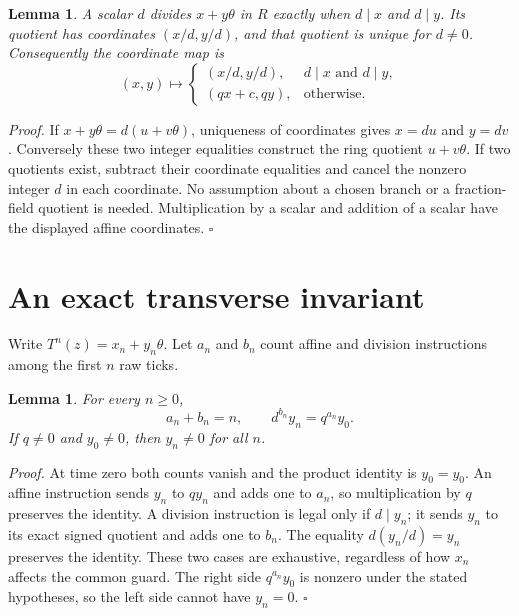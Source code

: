\documentclass[11pt,letterpaper]{article}
\newtheorem{lemma}[theorem]{Lemma}
\newenvironment{proof}{\noindent\textit{Proof.}}{\hfill\(\square\)}
\begin{document}
\begin{lemma}\label{Lem:Guard}
A scalar \(d\) divides \(x+y\theta\) in \(R\) exactly when \(d\mid x\)
and \(d\mid y\). Its quotient has coordinates \((x/d,y/d)\), and that
quotient is unique for \(d\ne0\). Consequently the coordinate map is
\[
(x,y)\longmapsto
\begin{cases}
(x/d,y/d),&d\mid x\text{ and }d\mid y,\\
(qx+c,qy),&\text{otherwise}.
\end{cases}
\]
\end{lemma}
\begin{proof}
If \(x+y\theta=d(u+v\theta)\), uniqueness of coordinates gives
\(x=du\) and \(y=dv\). Conversely these two integer equalities construct
the ring quotient \(u+v\theta\). If two quotients exist, subtract their
coordinate equalities and cancel the nonzero integer \(d\) in each
coordinate. No assumption about a chosen branch or a fraction-field
quotient is needed. Multiplication by a scalar and addition of a scalar
have the displayed affine coordinates.
\end{proof}

\section{An exact transverse invariant}

Write \(T^n(z)=x_n+y_n\theta\). Let \(a_n\) and \(b_n\) count affine and
division instructions among the first \(n\) raw ticks.

\begin{lemma}\label{Lem:Product}
For every \(n\ge0\),
\[
a_n+b_n=n,\qquad d^{b_n}y_n=q^{a_n}y_0.
\]
If \(q\ne0\) and \(y_0\ne0\), then \(y_n\ne0\) for all \(n\).
\end{lemma}
\begin{proof}
At time zero both counts vanish and the product identity is \(y_0=y_0\).
An affine instruction sends \(y_n\) to \(qy_n\) and adds one to \(a_n\),
so multiplication by \(q\) preserves the identity. A division instruction
is legal only if \(d\mid y_n\); it sends \(y_n\) to its exact signed
quotient and adds one to \(b_n\). The equality
\(d(y_n/d)=y_n\) preserves the identity. These two cases are exhaustive,
regardless of how \(x_n\) affects the common guard.
The right side \(q^{a_n}y_0\) is nonzero under the stated hypotheses,
so the left side cannot have \(y_n=0\).
\end{proof}
\end{document}
